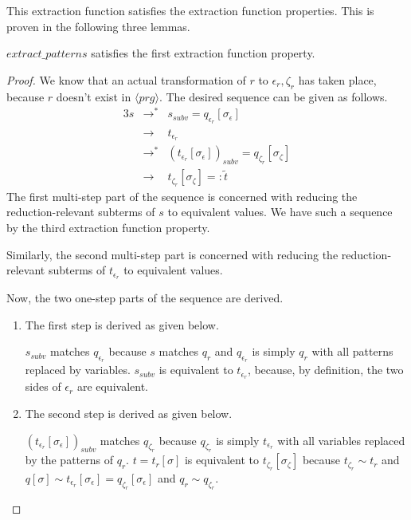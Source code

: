 This extraction function satisfies the extraction function properties. This is proven in the following three lemmas.

\begin{lemma}

$extract\_patterns$ satisfies the first extraction function property.

\begin{proof}

We know that an actual transformation of $r$ to $\epsilon_r, \zeta_r$ has taken place, because $r$ doesn't exist in $\langle prg \rangle$. The desired sequence can be given as follows.
\begin{alignat*}{3}
s &\longrightarrow^* &s_{subv} = q_{\epsilon_r}[\sigma_\epsilon]\\
&\longrightarrow &t_{\epsilon_r}\\
&\longrightarrow^*  &(t_{\epsilon_r}[\sigma_\epsilon])_{subv} = q_{\zeta_r}[\sigma_\zeta]\\
&\longrightarrow &t_{\zeta_r}[\sigma_\zeta] =: \widetilde{t}
\end{alignat*}
The first multi-step part of the sequence is concerned with reducing the reduction-relevant subterms of $s$ to equivalent values. We have such a sequence by the third extraction function property.

Similarly, the second multi-step part is concerned with reducing the reduction-relevant subterms of $t_{\epsilon_r}$ to equivalent values.

Now, the two one-step parts of the sequence are derived.

\begin{enumerate}
\item The first step is derived as given below.
\begin{prooftree}
\end{prooftree}
$s_{subv}$ matches $q_{\epsilon_r}$ because $s$ matches $q_r$ and $q_{\epsilon_r}$ is simply $q_r$ with all patterns replaced by variables. $s_{subv}$ is equivalent to $t_{\epsilon_r}$, because, by definition, the two sides of $\epsilon_r$ are equivalent.

\item The second step is derived as given below.
\begin{prooftree}
\end{prooftree}
$(t_{\epsilon_r}[\sigma_\epsilon])_{subv}$ matches $q_{\zeta_r}$ because $q_{\zeta_r}$ is simply $t_{\epsilon_r}$ with all variables replaced by the patterns of $q_r$. $t = t_r[\sigma]$ is equivalent to $t_{\zeta_r}[\sigma_\zeta]$ because $t_{\zeta_r} \sim t_r$ and $q[\sigma] \sim t_{\epsilon_r}[\sigma_\epsilon] = q_{\zeta_r}[\sigma_\epsilon]$ and $q_r \sim q_{\zeta_r}$.


\end{enumerate}
\end{proof}
\end{lemma}
